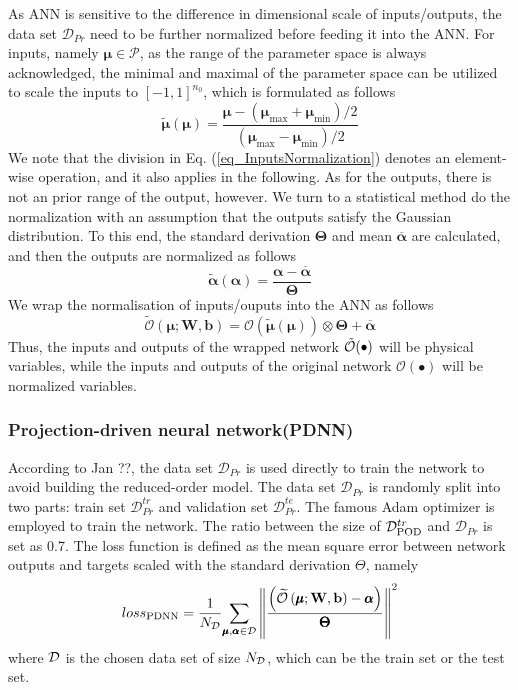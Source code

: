 \documentclass[preprint, 10pt]{elsarticle}
\begin{document}
As ANN is sensitive to the difference in dimensional scale of inputs/outputs,
the data set $\mathcal{D}_{Pr}$ need to be further normalized before feeding it into the ANN. For inputs, namely $\pmb{\mu} \in \mathcal{P}$, as the range of the parameter space is always acknowledged, the minimal and maximal of the parameter space can be utilized to scale the inputs to $[-1,1]^{n_0}$, which is formulated as follows
\begin{equation}
\tilde{\pmb{\mu}}(\pmb{\mu}) =
\frac
{{\pmb{\mu}}- ( {\pmb{\mu}}_{\max} +{\pmb{\mu}}_{\min} )/2}
{             ( {\pmb{\mu}}_{\max} -{\pmb{\mu}}_{\min} )/2}
\label{eq_InputsNormalization}
\end{equation}
We note that the division in Eq. (\ref{eq_InputsNormalization}) denotes an element-wise operation, and it also applies in the following.
As for the outputs, there is not an prior range of the output, however. We turn to a statistical method do the normalization with an assumption that the outputs satisfy the Gaussian distribution. To this end, the standard derivation $\pmb{\Theta}$ and mean $\overline {\pmb{\alpha}}$ are calculated, and then the outputs are normalized as follows
\begin{equation}
\tilde{\pmb{\alpha}}(\pmb{\alpha}) =
\frac
{{\pmb{\alpha}}- \overline {\pmb{\alpha}}}
{     \pmb{\Theta}         }
\end{equation}
We wrap the normalisation of inputs/ouputs into the ANN as follows
\begin{equation}
\tilde{\mathcal{O}}\left(\pmb{\mu}; \mathbf{W,b} \right)
 =
{\mathcal{O}}\left(\mathbf{ \tilde{\pmb{\mu}}(\pmb{\mu}) }\right)
\otimes
\pmb{\Theta} + \overline {\pmb{\alpha}}
\end{equation}
Thus, the inputs and outputs of the wrapped network  $\tilde{\cal{O}}(\bullet)$ will be physical variables, while the inputs and outputs of the original network $\mathcal{O}(\bullet)$  will be normalized variables.

\subsubsection{Projection-driven neural network(PDNN)}
According to Jan ??, the data set $\mathcal{D}_{Pr}$ is used directly to train the network to avoid building the reduced-order model. The data set $\mathcal{D}_{Pr}$ is randomly split into two parts: train set $\mathcal{D}_{Pr}^{tr}$ and validation set $\mathcal{D}_{Pr}^{te}$. The famous Adam optimizer is employed to train the network. The ratio between the size of $\mathcal{D}_{\rm{POD}}^{tr}$ and $\mathcal{D}_{Pr}$  is set as 0.7. The loss function is defined as the mean square error between network outputs and targets scaled with the standard derivation $\Theta$, namely
\begin{equation}
loss_{\rm{PDNN}} = \frac{1}{N_{\cal D}}
{{\sum\limits_{\pmb\mu ,\pmb\alpha  \in {\cal D}} {{{\left\| {\frac{\left( {\widetilde {\cal O}\left( {\pmb\mu ;{\bf{W}},{\bf{b}}} \right) - \pmb{\alpha} } \right)} {\pmb{\Theta}} } \right\|}^2}} }}
\end{equation}
where $\cal D$ is the chosen data set of size $N_{\cal D}$, which can be the train set or the test set.
\end{document}
